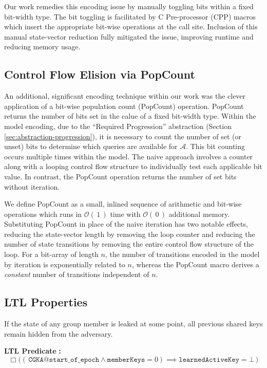 \documentclass[runningheads]{llncs}
\newcommand{\Adversary}{\ensuremath{\mathcal{A}}\xspace}
\newcommand{\BigO}[1]{\ensuremath{\mathcal{O}\left(\,#1\,\right)}\xspace}
\begin{document}
Our work remedies this encoding issue by manually toggling bits within a fixed bit-width \Promela type.
The bit toggling is facilitated by C Pre-processor (CPP) macros which insert the appropriate bit-wise operations at the call site.
Inclusion of this manual state-vector reduction fully mitigated the issue, improving runtime and reducing memory usage.


\subsection{Control Flow Elision via PopCount\label{sec:popcount}}

An additional, significant \Promela encoding technique within our work was the clever application of a bit-wise population count (PopCount) operation.
PopCount returns the number of bits set in the calue of a fixed bit-width type.
Within the model encoding, due to the ``Required Progression''  abstraction (Section \ref{sec:abstraction-progression}), it is necessary to count the number of set (or unset) bits to determine which queries are available for \Adversary.
This bit counting occurs multiple times within the model.
The naive approach involves a counter along with a looping control flow structure to individually test each applicable bit value.
In contrast, the PopCount operation returns the number of set bits without iteration.

We define PopCount as a small, inlined sequence of arithmetic and bit-wise operations which runs in \BigO{1} time with \BigO{0} additional memory.
Substituting PopCount in place of the naive iteration has two notable effects, reducing the state-vector length by removing the loop counter and reducing the number of state transitions by removing the entire control flow structure of the loop.
For a bit-array of length $n$, the number of transitions encoded in the model by iteration is exponentially related to $n$, whereas the PopCount macro derives a \emph{constant} number of transitions independent of $n$.

\subsection{LTL Properties}

\begin{definition}
If the state of any group member is leaked at some point, all previous shared keys remain hidden from the adversary.
\end{definition}%
\noindent\textbf{LTL Predicate} \textbf{:}%
\[%
\Box \Big( \left(\, \texttt{CGKA@start\_of\_epoch} \land \texttt{memberKeys} = 0\right) \implies \texttt{learnedActiveKey} = \bot \, \Big)%
\]%
\end{document}
